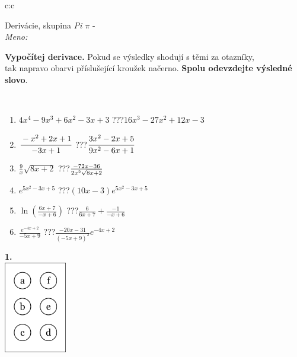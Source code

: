 \documentclass[10pt]{report}
\begin{document}
\begin{tabular}{c:c}
\begin{minipage}[c][104.5mm][t]{0.5\linewidth}
\begin{center}
\vspace{7mm}
{\huge Derivácie, skupina \textit{Pi $\pi$} -}\\[5mm]
\textit{Meno:}\phantom{xxxxxxxxxxxxxxxxxxxxxxxxxxxxxxxxxxxxxxxxxxxxxxxxxxxxxxxxxxxxxxxxx}\\[5mm]
\begin{minipage}{0.95\linewidth}
\begin{center}
\textbf{Vypočítej derivace.} Pokud se výsledky shodují s těmi za otazníky,\\tak napravo obarvi příslušející kroužek načerno. \textbf{Spolu odevzdejte výsledné slovo}.
\end{center}
\end{minipage}
\\[1mm]
\begin{minipage}{0.79\linewidth}
\begin{center}
\begin{varwidth}{\linewidth}
\begin{enumerate}
\normalsize
\item $4x^4-9x^3+6x^2-3x+3$\quad \dotfill\; ???\;\dotfill \quad $16x^3-27x^2+12x-3$
\item $\cfrac{-x^2+2x+1}{-3x+1}$\quad \dotfill\; ???\;\dotfill \quad $\cfrac{3x^2-2x+5}{9x^2-6x+1}$
\item $\frac{9}{x}\sqrt{8x+2}$\quad \dotfill\; ???\;\dotfill \quad $\frac{-72x-36}{2x^2 \sqrt{\smash[b]{8x+2}}}$
\item $e^{5x^2-3x+5}$\quad \dotfill\; ???\;\dotfill \quad $(10x-3)e^{5x^2-3x+5}$
\item $\ln{\left(\frac{6x+7}{-x+6}\right)}$\quad \dotfill\; ???\;\dotfill \quad $\frac{6}{6x+7}+\frac{-1}{-x+6}$
\item $\frac{e^{-4x+2}}{-5x+9}$\quad \dotfill\; ???\;\dotfill \quad $\frac{-20x-31}{(-5x+9)^2}e^{-4x+2}$
\end{enumerate}
\end{varwidth}
\end{center}
\end{minipage}
\begin{minipage}{0.20\linewidth}
\begin{center}
{\Huge\bfseries 1.} \\[2mm]
\includegraphics[height=40mm]{../images/braille.png}

\end{center}
\end{minipage}
\end{center}
\end{minipage}
\end{tabular}
\end{document}
